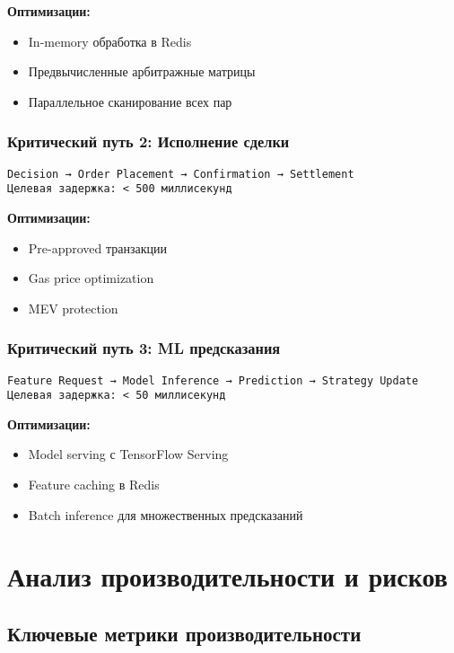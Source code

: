 \documentclass[a4paper,11pt]{article}
\begin{document}
\textbf{Оптимизации:}
\begin{itemize}
    \item In-memory обработка в Redis
    \item Предвычисленные арбитражные матрицы
    \item Параллельное сканирование всех пар
\end{itemize}

\subsubsection{Критический путь 2: Исполнение сделки}
\begin{verbatim}
Decision → Order Placement → Confirmation → Settlement
Целевая задержка: < 500 миллисекунд
\end{verbatim}

\textbf{Оптимизации:}
\begin{itemize}
    \item Pre-approved транзакции
    \item Gas price optimization
    \item MEV protection
\end{itemize}

\subsubsection{Критический путь 3: ML предсказания}
\begin{verbatim}
Feature Request → Model Inference → Prediction → Strategy Update
Целевая задержка: < 50 миллисекунд
\end{verbatim}

\textbf{Оптимизации:}
\begin{itemize}
    \item Model serving с TensorFlow Serving
    \item Feature caching в Redis
    \item Batch inference для множественных предсказаний
\end{itemize}

\newpage

\section{Анализ производительности и рисков}

\subsection{Ключевые метрики производительности}
\end{document}
